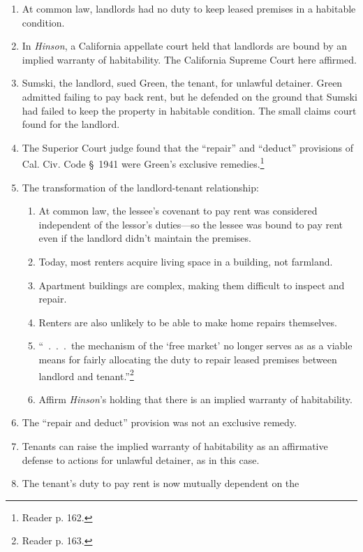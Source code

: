 \begin{enumerate}
    \item At common law, landlords had no duty to keep leased premises in a 
    habitable condition.
    \item In \emph{Hinson}, a California appellate court held that landlords 
    are bound by an implied warranty of habitability. The California Supreme 
    Court here affirmed.
    \item Sumski, the landlord, sued Green, the tenant, for unlawful 
    detainer. Green admitted failing to pay back rent, but he defended on the 
    ground that Sumski had failed to keep the property in habitable condition. 
    The small claims court found for the landlord.
    \item The Superior Court judge found that the ``repair'' and ``deduct'' 
    provisions of Cal. Civ. Code \S\ 1941 were Green's exclusive 
    remedies.\footnote{Reader p. 162.}
    \item The transformation of the landlord-tenant relationship:
    \begin{enumerate}
        \item At common law, the lessee's covenant to pay rent was considered 
        independent of the lessor's duties---so the lessee was bound to pay 
        rent even if the landlord didn't maintain the premises.
        \item Today, most renters acquire living space in a building, not 
        farmland.
        \item Apartment buildings are complex, making them difficult to 
        inspect and repair.
        \item Renters are also unlikely to be able to make home repairs 
        themselves.
        \item ``~.~.~.~the mechanism of the `free market' no longer serves as 
        as a viable means for fairly allocating the duty to repair leased 
        premises between landlord and tenant.''\footnote{Reader p. 163.}
        \item Affirm \emph{Hinson}'s holding that there is an implied warranty 
        of habitability.
    \end{enumerate}
    \item The ``repair and deduct'' provision was not an exclusive remedy.
    \item Tenants can raise the implied warranty of habitability as an 
    affirmative defense to actions for unlawful detainer, as in this case.
    \item The tenant's duty to pay rent is now mutually dependent on the 

\end{enumerate}
